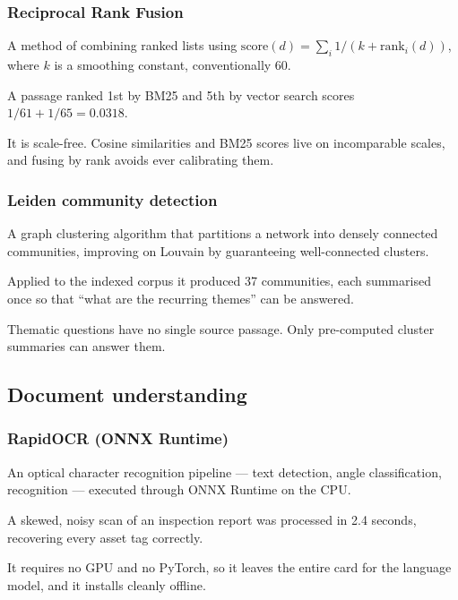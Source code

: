 \subsubsection{Reciprocal Rank Fusion}
\begin{description}[leftmargin=0pt,style=nextline]
\item[Definition.] A method of combining ranked lists using
$\mathrm{score}(d) = \sum_{i} 1/(k + \mathrm{rank}_i(d))$, where $k$ is a
smoothing constant, conventionally 60.
\item[Example.] A passage ranked 1st by BM25 and 5th by vector search scores
$1/61 + 1/65 = 0.0318$.
\item[Why chosen.] It is scale-free. Cosine similarities and BM25 scores live
on incomparable scales, and fusing by rank avoids ever calibrating them.
\end{description}

\subsubsection{Leiden community detection}
\begin{description}[leftmargin=0pt,style=nextline]
\item[Definition.] A graph clustering algorithm that partitions a network into
densely connected communities, improving on Louvain by guaranteeing
well-connected clusters.
\item[Example.] Applied to the indexed corpus it produced 37 communities, each
summarised once so that ``what are the recurring themes'' can be answered.
\item[Why chosen.] Thematic questions have no single source passage. Only
pre-computed cluster summaries can answer them.
\end{description}

\subsection{Document understanding}

\subsubsection{RapidOCR (ONNX Runtime)}
\begin{description}[leftmargin=0pt,style=nextline]
\item[Definition.] An optical character recognition pipeline --- text
detection, angle classification, recognition --- executed through ONNX Runtime
on the CPU.
\item[Example.] A skewed, noisy scan of an inspection report was processed in
2.4 seconds, recovering every asset tag correctly.
\item[Why chosen.] It requires no GPU and no PyTorch, so it leaves the entire
card for the language model, and it installs cleanly offline.
\end{description}

